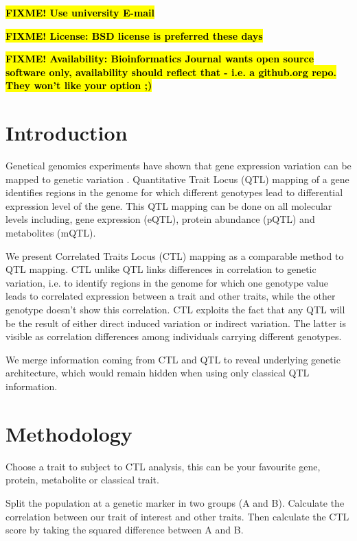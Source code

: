 \documentclass{bioinfo}
\newcommand{\comment}[1]{\hl{\bf FIXME! #1}}
\begin{document}
\comment{Use university E-mail}

\comment{License: BSD license is preferred these days}

\comment{Availability: Bioinformatics Journal wants open source software only,
availability should reflect that - i.e. a github.org repo. They won't
like your option ;)}

\section{Introduction}
  Genetical genomics experiments have shown that gene expression variation can be mapped to 
  genetic variation \cite{Jansen:2001}. Quantitative Trait Locus (QTL) mapping of a 
  gene identifies regions in the genome for which different genotypes lead to differential 
  expression level of the gene. This QTL mapping can be done on all molecular levels including, 
  gene expression (eQTL), protein abundance (pQTL) and metabolites (mQTL).
  
  We present Correlated Traits Locus (CTL) mapping as a comparable method to QTL mapping.
  CTL unlike QTL links differences in correlation to genetic variation, i.e. to identify regions in the 
  genome for which one genotype value leads to correlated expression between a trait and  
  other traits, while the other genotype doesn't show this correlation. CTL exploits the fact that 
  any QTL will be the result of either direct induced variation or indirect variation. The latter is 
  visible as correlation differences among individuals carrying different genotypes.
  
  We merge information coming from CTL and QTL to reveal underlying genetic architecture, which 
  would remain hidden when using only classical QTL information.

\section{Methodology}
  Choose a trait to subject to CTL analysis, this can be your favourite gene, 
  protein, metabolite or classical trait.

  Split the population at a genetic marker in two groups (A and B). Calculate the correlation 
  between our trait of interest and other traits. Then calculate the CTL score by taking the 
  squared difference between A and B.
\end{document}
